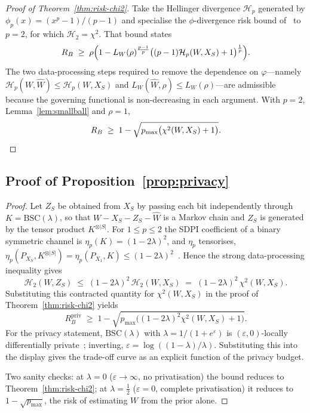\documentclass[journal]{IEEEtran}
\theoremstyle{definition}
\theoremstyle{remark}
\begin{document}
\begin{proof}[Proof of Theorem~\ref{thm:risk-chi2}]
Take the Hellinger divergence $\mathcal{H}_p$ generated by
$\phi_p(x)=(x^p-1)/(p-1)$ and specialise the
$\phi$-divergence risk bound of~\cite{esposito2024lower}
to $p=2$, for which $\mathcal{H}_2=\chi^2$. That bound
states
\[
  R_B \;\ge\;
  \rho\Bigl(
    1-L_W(\rho)^{\frac{p-1}{p}}
     \bigl((p-1)\mathcal{H}_p(W,X_S)+1\bigr)^{\frac1p}
  \Bigr).
\]
The two data-processing steps required to remove the
dependence on $\varphi$---namely
$\mathcal{H}_p(W,\widehat W)\le\mathcal{H}_p(W,X_S)$ and
$L_W(\widehat W,\rho)\le L_W(\rho)$---are admissible
because the governing functional is non-decreasing in each
argument. With $p=2$, Lemma~\ref{lem:smallball} and
$\rho=1$,
\[
  R_B \;\ge\;
  1-\sqrt{p_{\max}\bigl(\chi^2(W,X_S)+1\bigr)} .
\qedhere
\]
\end{proof}

\subsection{Proof of Proposition~\ref{prop:privacy}}
\label{app:proof-privacy}

\begin{proof}
Let $Z_S$ be obtained from $X_S$ by passing each bit
independently through $K=\mathrm{BSC}(\lambda)$, so that
$W-X_S-Z_S-\widehat W$ is a Markov chain and
$Z_S$ is generated by the tensor product $K^{\otimes|S|}$.
For $1\le p\le 2$ the SDPI coefficient of a binary
symmetric channel is
$\eta_p(K)=(1-2\lambda)^2$, and $\eta_p$ tensorises,
$\eta_p(P_{X_S},K^{\otimes|S|})=\eta_p(P_{X_1},K)
\le(1-2\lambda)^2$~\cite{esposito2024lower}. Hence the
strong data-processing inequality gives
\[
  \mathcal{H}_2(W,Z_S)
  \;\le\; (1-2\lambda)^2\,\mathcal{H}_2(W,X_S)
  \;=\; (1-2\lambda)^2\,\chi^2(W,X_S).
\]
Substituting this contracted quantity for
$\chi^2(W,X_S)$ in the proof of
Theorem~\ref{thm:risk-chi2} yields
\[
  R_B^{\mathrm{priv}}
  \;\ge\;
  1-\sqrt{p_{\max}\bigl((1-2\lambda)^2\chi^2(W,X_S)+1
  \bigr)} .
\]
For the privacy statement, $\mathrm{BSC}(\lambda)$ with
$\lambda=1/(1+e^{\varepsilon})$ is
$(\varepsilon,0)$-locally differentially
private~\cite{esposito2024lower}; inverting,
$\varepsilon=\log((1-\lambda)/\lambda)$. Substituting this
into the display gives the trade-off curve as an explicit
function of the privacy budget.

Two sanity checks: at $\lambda=0$ ($\varepsilon\to\infty$,
no privatisation) the bound reduces to
Theorem~\ref{thm:risk-chi2}; at $\lambda=\tfrac12$
($\varepsilon=0$, complete privatisation) it reduces to
$1-\sqrt{p_{\max}}$, the risk of estimating $W$ from the
prior alone.
\end{proof}


\balance


\end{document}
